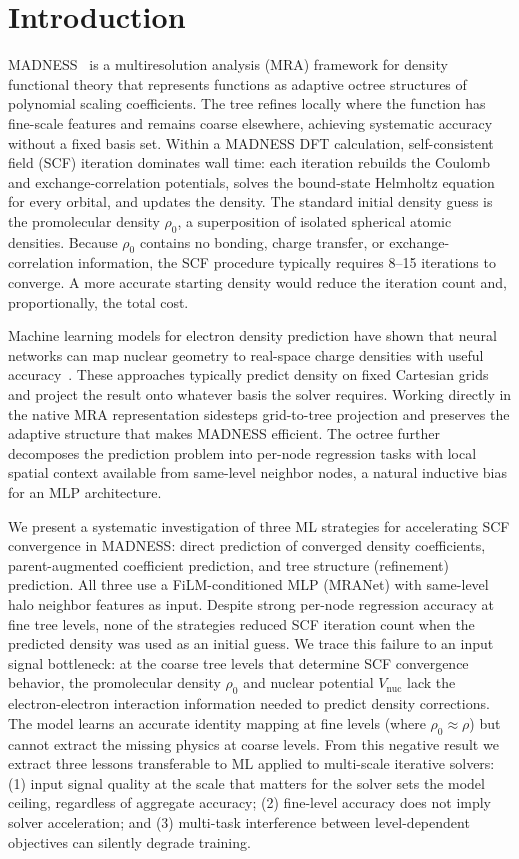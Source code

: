 \section{Introduction}\label{sec:introduction}

MADNESS~\cite{harrison2016madness} is a multiresolution analysis (MRA) framework for density functional theory that represents functions as adaptive octree structures of polynomial scaling coefficients.
The tree refines locally where the function has fine-scale features and remains coarse elsewhere, achieving systematic accuracy without a fixed basis set.
Within a MADNESS DFT calculation, self-consistent field (SCF) iteration dominates wall time: each iteration rebuilds the Coulomb and exchange-correlation potentials, solves the bound-state Helmholtz equation for every orbital, and updates the density.
The standard initial density guess is the promolecular density $\rho_0$, a superposition of isolated spherical atomic densities.
Because $\rho_0$ contains no bonding, charge transfer, or exchange-correlation information, the SCF procedure typically requires 8--15 iterations to converge.
A more accurate starting density would reduce the iteration count and, proportionally, the total cost.

Machine learning models for electron density prediction have shown that neural networks can map nuclear geometry to real-space charge densities with useful accuracy~\cite{gong2025gedcrn}.
These approaches typically predict density on fixed Cartesian grids and project the result onto whatever basis the solver requires.
Working directly in the native MRA representation sidesteps grid-to-tree projection and preserves the adaptive structure that makes MADNESS efficient.
The octree further decomposes the prediction problem into per-node regression tasks with local spatial context available from same-level neighbor nodes, a natural inductive bias for an MLP architecture.

We present a systematic investigation of three ML strategies for accelerating SCF convergence in MADNESS: direct prediction of converged density coefficients, parent-augmented coefficient prediction, and tree structure (refinement) prediction.
All three use a FiLM-conditioned MLP (MRANet) with same-level halo neighbor features as input.
Despite strong per-node regression accuracy at fine tree levels, none of the strategies reduced SCF iteration count when the predicted density was used as an initial guess.
We trace this failure to an input signal bottleneck: at the coarse tree levels that determine SCF convergence behavior, the promolecular density $\rho_0$ and nuclear potential $V_\mathrm{nuc}$ lack the electron-electron interaction information needed to predict density corrections.
The model learns an accurate identity mapping at fine levels (where $\rho_0 \approx \rho$) but cannot extract the missing physics at coarse levels.
From this negative result we extract three lessons transferable to ML applied to multi-scale iterative solvers: (1) input signal quality at the scale that matters for the solver sets the model ceiling, regardless of aggregate accuracy; (2) fine-level accuracy does not imply solver acceleration; and (3) multi-task interference between level-dependent objectives can silently degrade training.
